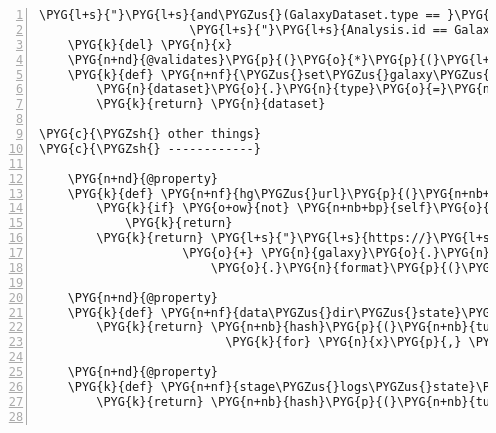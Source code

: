 \begin{Verbatim}[commandchars=\\\{\},numbers=left,firstnumber=1,stepnumber=5]
                \PYG{l+s}{"}\PYG{l+s}{and\PYGZus{}(GalaxyDataset.type == }\PYG{l+s}{'}\PYG{l+s+si}{\PYGZpc{}s}\PYG{l+s}{'}\PYG{l+s}{, }\PYG{l+s}{"}
                     \PYG{l+s}{"}\PYG{l+s}{Analysis.id == GalaxyDataset.analysis\PYGZus{}id)}\PYG{l+s}{"} \PYG{o}{\PYGZpc{}} \PYG{n}{x}\PYG{p}{)}
    \PYG{k}{del} \PYG{n}{x}
    \PYG{n+nd}{@validates}\PYG{p}{(}\PYG{o}{*}\PYG{p}{(}\PYG{l+s}{"}\PYG{l+s}{galaxy\PYGZus{}}\PYG{l+s}{"} \PYG{o}{+} \PYG{n}{x} \PYG{k}{for} \PYG{n}{x} \PYG{o+ow}{in} \PYG{n}{galaxy\PYGZus{}stuff}\PYG{p}{)}\PYG{p}{)}
    \PYG{k}{def} \PYG{n+nf}{\PYGZus{}set\PYGZus{}galaxy\PYGZus{}}\PYG{p}{(}\PYG{n+nb+bp}{self}\PYG{p}{,} \PYG{n}{attr}\PYG{p}{,} \PYG{n}{dataset}\PYG{p}{)}\PYG{p}{:}
        \PYG{n}{dataset}\PYG{o}{.}\PYG{n}{type}\PYG{o}{=}\PYG{n}{attr}\PYG{p}{[}\PYG{l+m+mi}{7}\PYG{p}{:}\PYG{p}{]}
        \PYG{k}{return} \PYG{n}{dataset}

\PYG{c}{\PYGZsh{} other things}
\PYG{c}{\PYGZsh{} ------------}

    \PYG{n+nd}{@property}
    \PYG{k}{def} \PYG{n+nf}{hg\PYGZus{}url}\PYG{p}{(}\PYG{n+nb+bp}{self}\PYG{p}{)}\PYG{p}{:}
        \PYG{k}{if} \PYG{o+ow}{not} \PYG{n+nb+bp}{self}\PYG{o}{.}\PYG{n}{galaxy\PYGZus{}hg\PYGZus{}text}\PYG{p}{:}
            \PYG{k}{return}
        \PYG{k}{return} \PYG{l+s}{"}\PYG{l+s}{https://}\PYG{l+s}{"} \PYG{o}{+} \PYG{n}{galaxy}\PYG{o}{.}\PYG{n}{hostname} \PYGZbs{}
                    \PYG{o}{+} \PYG{n}{galaxy}\PYG{o}{.}\PYG{n}{dataset\PYGZus{}display\PYGZus{}url\PYGZus{}template} \PYGZbs{}
                        \PYG{o}{.}\PYG{n}{format}\PYG{p}{(}\PYG{n}{dataset}\PYG{o}{=}\PYG{n+nb+bp}{self}\PYG{o}{.}\PYG{n}{galaxy\PYGZus{}hg\PYGZus{}text}\PYG{o}{.}\PYG{n}{id}\PYG{p}{)}

    \PYG{n+nd}{@property}
    \PYG{k}{def} \PYG{n+nf}{data\PYGZus{}dir\PYGZus{}state}\PYG{p}{(}\PYG{n+nb+bp}{self}\PYG{p}{)}\PYG{p}{:}
        \PYG{k}{return} \PYG{n+nb}{hash}\PYG{p}{(}\PYG{n+nb}{tuple}\PYG{p}{(}\PYG{p}{(}\PYG{n}{x}\PYG{p}{,}\PYG{n+nb}{tuple}\PYG{p}{(}\PYG{n}{y}\PYG{p}{)}\PYG{p}{,}\PYG{n+nb}{tuple}\PYG{p}{(}\PYG{n}{z}\PYG{p}{)}\PYG{p}{)}
                          \PYG{k}{for} \PYG{n}{x}\PYG{p}{,} \PYG{n}{y}\PYG{p}{,} \PYG{n}{z} \PYG{o+ow}{in} \PYG{n}{os}\PYG{o}{.}\PYG{n}{walk}\PYG{p}{(}\PYG{n+nb+bp}{self}\PYG{o}{.}\PYG{n}{data\PYGZus{}dir}\PYG{p}{)}\PYG{p}{)}\PYG{p}{)}

    \PYG{n+nd}{@property}
    \PYG{k}{def} \PYG{n+nf}{stage\PYGZus{}logs\PYGZus{}state}\PYG{p}{(}\PYG{n+nb+bp}{self}\PYG{p}{)}\PYG{p}{:}
        \PYG{k}{return} \PYG{n+nb}{hash}\PYG{p}{(}\PYG{n+nb}{tuple}\PYG{p}{(}\PYG{n}{log}\PYG{o}{.}\PYG{n}{text} \PYG{k}{for} \PYG{n}{log} \PYG{o+ow}{in} \PYG{n+nb+bp}{self}\PYG{o}{.}\PYG{n}{stage\PYGZus{}logs}\PYG{p}{)}\PYG{p}{)}


\end{Verbatim}
